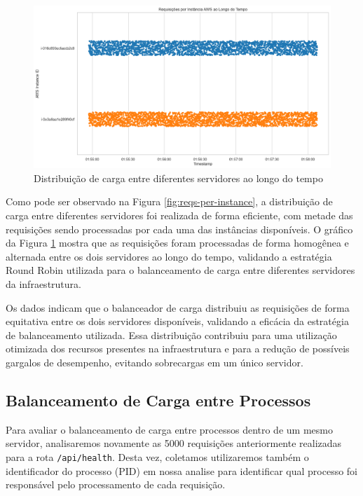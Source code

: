 \begin{figure}[H]
    \centering
    \includegraphics[width=1\textwidth]{assets/balance-test/reqs-per-instance-over-time.png}
    \caption{Distribuição de carga entre diferentes servidores ao longo do tempo}
    \label{fig:reqs-per-instance-over-time}
\end{figure}

Como pode ser observado na Figura \ref{fig:reqs-per-instance}, a distribuição de carga entre diferentes servidores foi realizada de forma eficiente, com metade das requisições sendo processadas por cada uma das instâncias disponíveis. O gráfico da Figura \ref{fig:reqs-per-instance-over-time} mostra que as requisições foram processadas de forma homogênea e alternada entre os dois servidores ao longo do tempo, validando a estratégia Round Robin utilizada para o balanceamento de carga entre diferentes servidores da infraestrutura.

Os dados indicam que o balanceador de carga distribuiu as requisições de forma equitativa entre os dois servidores disponíveis, validando a eficácia da estratégia de balanceamento utilizada. Essa distribuição contribuiu para uma utilização otimizada dos recursos presentes na infraestrutura e para a redução de possíveis gargalos de desempenho, evitando sobrecargas em um único servidor.

\subsection{Balanceamento de Carga entre Processos}

Para avaliar o balanceamento de carga entre processos dentro de um mesmo servidor, analisaremos novamente as 5000 requisições anteriormente realizadas para a rota \texttt{/api/health}. Desta vez, coletamos utilizaremos também o identificador do processo (PID) em nossa analise para identificar qual processo foi responsável pelo processamento de cada requisição.

